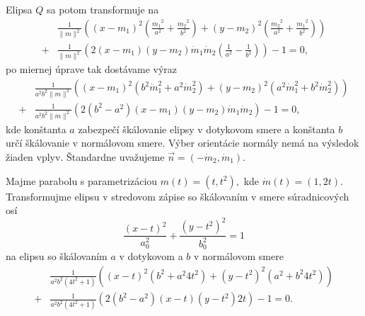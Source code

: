 Elipsa $Q$ sa potom transformuje na 
\begin{align} 
\label{eq:elipsa_v_novej_baze}
&\frac{1}{\|{m}\|^2} \left( (x - m_1)^2 \left( \frac{{\dot{m}_1}^2}{a^2} + \frac{{\dot{m}_2}^2}{b^2} \right) + (y - m_2)^2 \left( \frac{{\dot{m}_2}^2}{a^2} + \frac{{\dot{m}_1}^2}{b^2} \right) \right) \\
+ &\frac{1}{\|{m}\|^2} \left( 2(x - m_1)(y - m_2)\dot{m}_1\dot{m}_2 \left( \frac{1}{a^2} - \frac{1}{b^2} \right) \right) - 1 = 0,
\end{align}
po miernej úprave tak dostávame výraz
\begin{align*} 
&\frac{1}{a^2b^2\|m\|^2} \left( (x - m_1)^2 \left( b^2 \dot{m}_1^2 + a^2 \dot{m}_2^2 \right) + (y - m_2)^2 \left( a^2 \dot{m}_1^2 + b^2 \dot{m}_2^2 \right) \right) \\
+ &\frac{1}{a^2b^2\|\dot{m}\|^2} \left( 2(b^2 - a^2)(x - m_1)(y - m_2)\dot{m}_1\dot{m}_2 \right) - 1 = 0,
\end{align*}
kde konštanta $a$ zabezpečí škálovanie elipsy v dotykovom smere a konštanta $b$ určí škálovanie v normálovom smere. Výber orientácie normály nemá na výsledok žiaden vplyv. Štandardne uvažujeme $\vec{n}=(-\dot{m}_2, \dot{m}_1).$

\begin{example}[Parabola]
Majme parabolu s parametrizáciou $m(t)=(t, t^2), $ kde $\dot{m}(t)=(1, 2t).$ Transformujme elipsu v stredovom zápise so škálovaním v smere súradnicových osí
\begin{equation*}
\frac{(x - t)^2}{a_0^2} + \frac{(y - t^2)^2}{b_0^2} = 1
\end{equation*}
na elipsu so škálovaním $a$ v dotykovom a $b$ v normálovom smere
\begin{align*}
&\frac{1}{a^{2} b^{2}\left(4 t^{2} + 1\right)} \left( (x-t)^2 (b^2 + a^{2} 4t^2) + (y-t^2)^2 (a^2 + b^2 4t^2) \right)\\
+ &\frac{1}{a^{2} b^{2}\left(4 t^{2} + 1\right)} \left( 2(b^2 - a^2)(x-t)(y-t^2)2t \right) - 1 = 0.
\end{align*}
\end{example}

